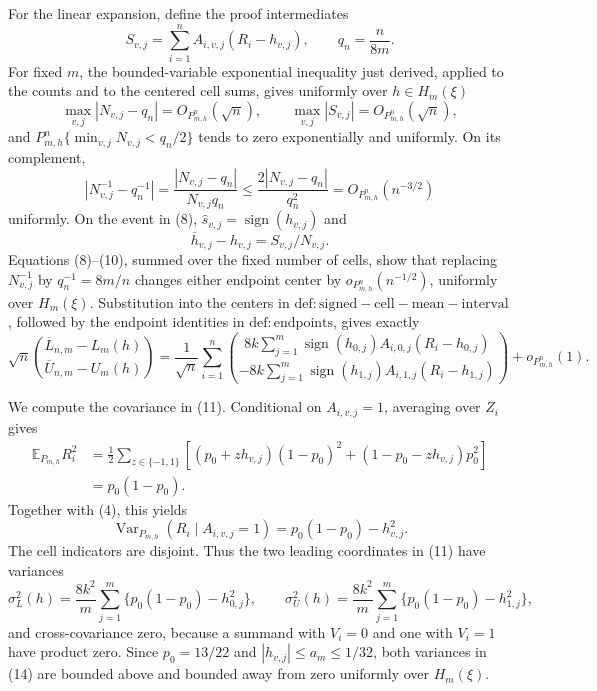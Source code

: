 For the linear expansion, define the proof intermediates
\[
 S_{v,j}=\sum_{i=1}^{n}A_{i,v,j}(R_i-h_{v,j}),
 \qquad q_n=\frac{n}{8m}.
\]
For fixed \(m\), the bounded-variable exponential inequality just derived, applied to the counts and to the centered cell sums, gives uniformly over \(h\in H_m(\xi)\)
\[
 \max_{v,j}|N_{v,j}-q_n|=O_{P_{m,h}^{n}}(\sqrt n),
 \qquad
 \max_{v,j}|S_{v,j}|=O_{P_{m,h}^{n}}(\sqrt n),                           \tag{9}
\]
and \(P_{m,h}^{n}\{\min_{v,j}N_{v,j}<q_n/2\}\) tends to zero exponentially and uniformly. On its complement,
\[
 \left|N_{v,j}^{-1}-q_n^{-1}\right|
 =\frac{|N_{v,j}-q_n|}{N_{v,j}q_n}
 \leq\frac{2|N_{v,j}-q_n|}{q_n^2}
 =O_{P_{m,h}^{n}}(n^{-3/2})                                             \tag{10}
\]
uniformly. On the event in (8), \(\widehat s_{v,j}=\operatorname{sign}(h_{v,j})\) and
\[
 \overline h_{v,j}-h_{v,j}=S_{v,j}/N_{v,j}.
\]
Equations (8)--(10), summed over the fixed number of cells, show that replacing \(N_{v,j}^{-1}\) by \(q_n^{-1}=8m/n\) changes either endpoint center by \(o_{P_{m,h}^{n}}(n^{-1/2})\), uniformly over \(H_m(\xi)\). Substitution into the centers in \(\mathrm{def:signed-cell-mean-interval}\), followed by the endpoint identities in \(\mathrm{def:endpoints}\), gives exactly
\[
 \sqrt n
 \binom{\overline L_{n,m}-L_m(h)}{\overline U_{n,m}-U_m(h)}
 =\frac1{\sqrt n}\sum_{i=1}^{n}
 \binom{8k\sum_{j=1}^{m}\operatorname{sign}(h_{0,j})A_{i,0,j}(R_i-h_{0,j})}
 {-8k\sum_{j=1}^{m}\operatorname{sign}(h_{1,j})A_{i,1,j}(R_i-h_{1,j})}
 +o_{P_{m,h}^{n}}(1).                                                    \tag{11}
\]

We compute the covariance in (11). Conditional on \(A_{i,v,j}=1\), averaging over \(Z_i\) gives
\[
 \begin{split}
 \mathbb E_{P_{m,h}}R_i^2
 &=\frac12\sum_{z\in\{-1,1\}}
 \left[(p_0+zh_{v,j})(1-p_0)^2+(1-p_0-zh_{v,j})p_0^2\right]\\
 &=p_0(1-p_0).
 \end{split}                                                            \tag{12}
\]
Together with (4), this yields
\[
 \operatorname{Var}_{P_{m,h}}(R_i\mid A_{i,v,j}=1)
 =p_0(1-p_0)-h_{v,j}^2.                                                  \tag{13}
\]
The cell indicators are disjoint. Thus the two leading coordinates in (11) have variances
\[
 \sigma_L^2(h)=\frac{8k^2}{m}\sum_{j=1}^{m}\{p_0(1-p_0)-h_{0,j}^2\},
 \qquad
 \sigma_U^2(h)=\frac{8k^2}{m}\sum_{j=1}^{m}\{p_0(1-p_0)-h_{1,j}^2\},    \tag{14}
\]
and cross-covariance zero, because a summand with \(V_i=0\) and one with \(V_i=1\) have product zero. Since \(p_0=13/22\) and \(|h_{v,j}|\leq a_m\leq1/32\), both variances in (14) are bounded above and bounded away from zero uniformly over \(H_m(\xi)\).

